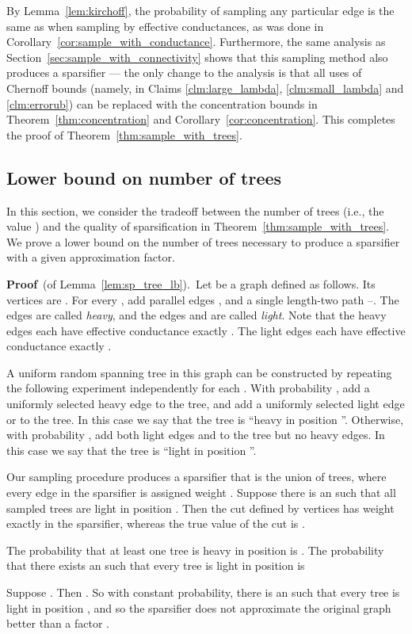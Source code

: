 \documentclass[11pt]{article}
\newcommand{\proofbelow}{8pt}
\numberwithin{equation}{section}
\newenvironment{proofof}[1]{\noindent\textbf{Proof} \,(of #1).\,}{\afterproof}
\newcommand{\afterproof}{\hfill  \par \vspace{\proofbelow}}
\newcommand{\Corollary}[1]{Corollary~\ref{cor:#1}}
\newcommand{\Lemma}[1]{Lemma~\ref{lem:#1}}
\newcommand{\SectionName}[1]{\label{sec:#1}}
\newcommand{\Section}[1]{Section~\ref{sec:#1}}
\newcommand{\Theorem}[1]{Theorem~\ref{thm:#1}}
\begin{document}
By \Lemma{kirchoff}, the probability of sampling any particular edge is the same as
when sampling by effective conductances, as was done in \Corollary{sample_with_conductance}.
Furthermore, the same analysis as \Section{sample_with_connectivity} shows that this
sampling method also produces a sparsifier --- the only change to the analysis is that
all uses of Chernoff bounds 
(namely, in Claims \ref{clm:large_lambda}, \ref{clm:small_lambda}
and \ref{clm:errorub})
can be replaced with the concentration bounds in \Theorem{concentration}
and \Corollary{concentration}.
This completes the proof of \Theorem{sample_with_trees}.



\subsection{Lower bound on number of trees}
\SectionName{sp_tree_lb}

In this section, we consider the tradeoff between the number of trees (i.e., the value )
and the quality of sparsification in Theorem~\ref{thm:sample_with_trees}.
We prove a lower bound on the number of trees necessary to produce a sparsifier
with a given approximation factor.

\vspace{6pt}
\begin{proofof}{\Lemma{sp_tree_lb}}
Let  be a graph defined as follows.
Its vertices are .
For every , add  parallel edges
,
and a single length-two path --.
The edges  are called \textit{heavy},
and the edges  and  are called \textit{light}.
Note that the heavy edges each have effective conductance exactly .
The light edges each have effective conductance exactly .

A uniform random spanning tree in this graph can be constructed by repeating
the following experiment independently for each .
With probability , add a uniformly selected heavy edge 
to the tree, and add a uniformly selected light edge  or  to the tree.
In this case we say that the tree is ``heavy in position ''.
Otherwise, with probability , add both light edges  and  to the tree
but no heavy edges.
In this case we say that the tree is ``light in position ''.

Our sampling procedure produces a sparsifier that is the union of  trees,
where every edge  in the sparsifier is assigned weight .
Suppose there is an  such that all sampled trees are light in position .
Then the cut defined by vertices 
has weight exactly  in the sparsifier,
whereas the true value of the cut is .

The probability that at least one tree is heavy in position  is .
The probability that there exists an  such that every tree is light in position  is

Suppose .
Then .
So with constant probability, there is an  such that every tree is light in position ,
and so the sparsifier does not approximate the original graph better than a factor
.
\end{proofof}
\end{document}
